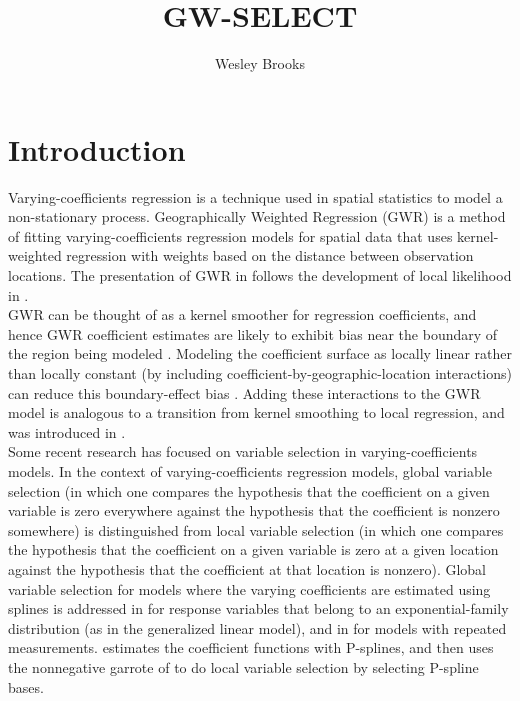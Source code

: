 \documentclass[authoryear, review, 11pt]{elsarticle}
\title{GW-SELECT}
\author{Wesley Brooks}
\date{}                                           %
\begin{document}
\maketitle





\section{Introduction}
	Varying-coefficients regression \citep{Hastie:1993a} is a technique used in spatial statistics to model a non-stationary process. Geographically Weighted Regression (GWR) \citep{Fotheringham:2002} is a method of fitting varying-coefficients regression models for spatial data that uses kernel-weighted regression with weights based on the distance between observation locations. The presentation of GWR in \cite{Fotheringham:2002} follows the development of local likelihood in \cite{Loader:1999}.\\
	
	GWR can be thought of as a kernel smoother for regression coefficients, and hence GWR coefficient estimates are likely to exhibit bias near the boundary of the region being modeled \citep{Hastie:1993b}. Modeling the coefficient surface as locally linear rather than locally constant (by including coefficient-by-geographic-location interactions) can reduce this boundary-effect bias \citep{Hastie:1993b}. Adding these interactions to the GWR model is analogous to a transition from kernel smoothing to local regression, and was introduced in \cite{Wang:2008b}.\\
	
	Some recent research has focused on variable selection in varying-coefficients models. In the context of varying-coefficients regression models, global variable selection (in which one compares the hypothesis that the coefficient on a given variable is zero everywhere against the hypothesis that the coefficient is nonzero somewhere) is distinguished from local variable selection (in which one compares the hypothesis that the coefficient on a given variable is zero at a given location against the hypothesis that the coefficient at that location is nonzero). Global variable selection for models where the varying coefficients are estimated using splines is addressed in \cite{Fan:1999} for response variables that belong to an exponential-family distribution (as in the generalized linear model), and in \cite{Wang:2008a} for models with repeated measurements. \cite{Antoniadis:2012a} estimates the coefficient functions with P-splines, and then uses the nonnegative garrote of \cite{Breiman:1995} to do local variable selection by selecting P-spline bases.\\
	
\end{document}

